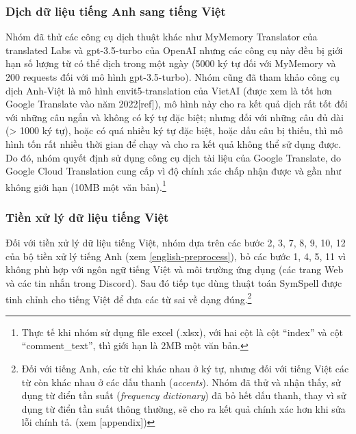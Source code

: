 \subsubsection{Dịch dữ liệu tiếng Anh sang tiếng Việt}
Nhóm đã thử các công cụ dịch thuật khác như MyMemory Translator của translated Labs và gpt-3.5-turbo của OpenAI nhưng các công cụ này đều bị giới hạn số lượng từ có thể dịch trong một ngày (5000 ký tự đối với MyMemory và 200 requests đối với mô hình gpt-3.5-turbo). Nhóm cũng đã tham khảo công cụ dịch Anh-Việt là mô hình envit5-translation của VietAI (được xem là tốt hơn Google Translate vào năm 2022[ref]), mô hình này cho ra kết quả dịch rất tốt đối với những câu ngắn và không có ký tự đặc biệt; nhưng đối với những câu đủ dài (> 1000 ký tự), hoặc có quá nhiều ký tự đặc biệt, hoặc dấu câu bị thiếu, thì mô hình tốn rất nhiều thời gian để chạy và cho ra kết quả không thể sử dụng được. Do đó, nhóm quyết định sử dụng công cụ dịch tài liệu của Google Translate, do Google Cloud Translation cung cấp vì độ chính xác chấp nhận được và gần như không giới hạn (10MB một văn bản).\footnote{Thực tế khi nhóm sử dụng file excel (.xlsx), với hai cột là cột ``index'' và cột ``comment\_text'', thì giới hạn là 2MB một văn bản.}

\subsubsection{Tiền xử lý dữ liệu tiếng Việt}
Đối với tiền xử lý dữ liệu tiếng Việt, nhóm dựa trên các bước 2, 3, 7, 8, 9, 10, 12 của bộ tiền xử lý tiếng Anh (xem \ref{english-preprocess}), bỏ các bước 1, 4, 5, 11 vì không phù hợp với ngôn ngữ tiếng Việt và môi trường ứng dụng (các trang Web và các tin nhắn trong Discord). Sau đó tiếp tục dùng thuật toán SymSpell được tinh chỉnh cho tiếng Việt để đưa các từ sai về dạng đúng.\footnote{Đối với tiếng Anh, các từ chỉ khác nhau ở ký tự, nhưng đối với tiếng Việt các từ còn khác nhau ở các dấu thanh (\textit{accents}). Nhóm đã thử và nhận thấy, sử dụng từ điển tần suất (\textit{frequency dictionary}) đã bỏ hết dấu thanh, thay vì sử dụng từ điển tần suất thông thường, sẽ cho ra kết quả chính xác hơn khi sửa lỗi chính tả. (xem [appendix])}
